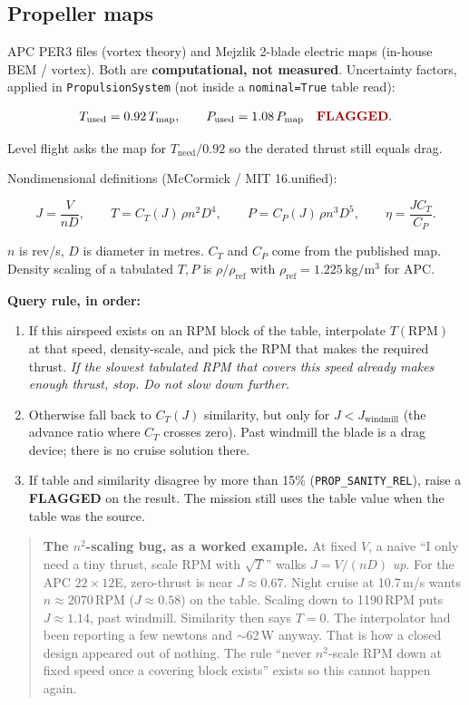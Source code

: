 \documentclass[11pt,letterpaper]{article}
\newcommand{\flag}{\textcolor{red!60!black}{\textbf{FLAGGED}}}
\newcommand{\code}[1]{\texttt{#1}}
\newenvironment{warningbox}{\begin{quote}\small}{\end{quote}}
\begin{document}
\subsection{Propeller maps}

APC PER3 files (vortex theory) and Mejzlik 2-blade electric maps (in-house BEM / vortex). Both are \textbf{computational, not measured}. Uncertainty factors, applied in \code{PropulsionSystem} (not inside a \code{nominal=True} table read):

\begin{equation}
  T_\mathrm{used} = 0.92\, T_\mathrm{map}, \qquad
  P_\mathrm{used} = 1.08\, P_\mathrm{map}
  \quad \text{\flag{}}.
\end{equation}

Level flight asks the map for $T_\mathrm{need}/0.92$ so the derated thrust still equals drag.

Nondimensional definitions (McCormick / MIT 16.unified):

\begin{equation}
  J = \frac{V}{n D}, \qquad
  T = C_T(J)\, \rho n^2 D^4, \qquad
  P = C_P(J)\, \rho n^3 D^5, \qquad
  \eta = \frac{J C_T}{C_P}.
\end{equation}

$n$ is rev/s, $D$ is diameter in metres. $C_T$ and $C_P$ come from the published map. Density scaling of a tabulated $T,P$ is $\rho/\rho_\mathrm{ref}$ with $\rho_\mathrm{ref} = 1.225\,\mathrm{kg/m^3}$ for APC.

\textbf{Query rule, in order:}

\begin{enumerate}
  \item If this airspeed exists on an RPM block of the table, interpolate $T(\mathrm{RPM})$ at that speed, density-scale, and pick the RPM that makes the required thrust. \emph{If the slowest tabulated RPM that covers this speed already makes enough thrust, stop. Do not slow down further.}
  \item Otherwise fall back to $C_T(J)$ similarity, but only for $J < J_\mathrm{windmill}$ (the advance ratio where $C_T$ crosses zero). Past windmill the blade is a drag device; there is no cruise solution there.
  \item If table and similarity disagree by more than 15\% (\code{PROP\_SANITY\_REL}), raise a \flag{} on the result. The mission still uses the table value when the table was the source.
\end{enumerate}

\begin{warningbox}
\textbf{The $n^2$-scaling bug, as a worked example.}
At fixed $V$, a naive ``I only need a tiny thrust, scale RPM with $\sqrt{T}$'' walks $J = V/(nD)$ \emph{up}. For the APC $22\times12$E, zero-thrust is near $J \approx 0.67$. Night cruise at 10.7\,m/s wants $n \approx 2070$\,RPM ($J \approx 0.58$) on the table. Scaling down to 1190\,RPM puts $J \approx 1.14$, past windmill. Similarity then says $T=0$. The interpolator had been reporting a few newtons and $\sim$62\,W anyway. That is how a closed design appeared out of nothing. The rule ``never $n^2$-scale RPM down at fixed speed once a covering block exists'' exists so this cannot happen again.
\end{warningbox}
\end{document}
